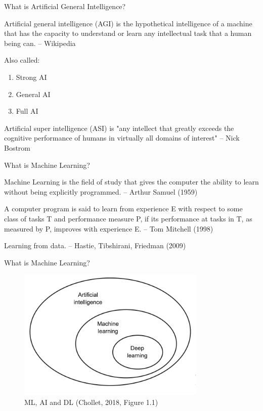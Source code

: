 \documentclass[10pt]{beamer}
\begin{document}
\begin{frame}{What is Artificial General Intelligence?}

Artificial general intelligence (AGI) is the hypothetical intelligence of a machine that has the capacity to understand or learn any intellectual task that a human being can. -- Wikipedia

Also called:
\begin{enumerate}
\item Strong AI
\item General AI
\item Full AI
\end{enumerate}

\pause
Artificial super intelligence (ASI) is "any intellect that greatly exceeds the cognitive performance of humans in virtually all domains of interest" -- Nick Bostrom

\end{frame}



\begin{frame}{What is Machine Learning?}

Machine Learning is the field of study that gives the computer the ability to learn without being explicitly programmed. -- Arthur Samuel (1959)

A computer program is said to learn from experience E with respect to some class of tasks T and performance measure P, if its performance at tasks in T, as measured by P, improves with experience E. -- Tom Mitchell (1998)\pause

Learning from data. -- Hastie, Tibshirani, Friedman (2009)
\end{frame}


\begin{frame}{What is Machine Learning?}

\begin{figure}[h]
\caption{ML, AI and DL (Chollet, 2018, Figure 1.1)}
\centering
\includegraphics[width=0.8\textwidth]{figs/fig1_1_chollet.png}
\end{figure}

\end{frame}
\end{document}

